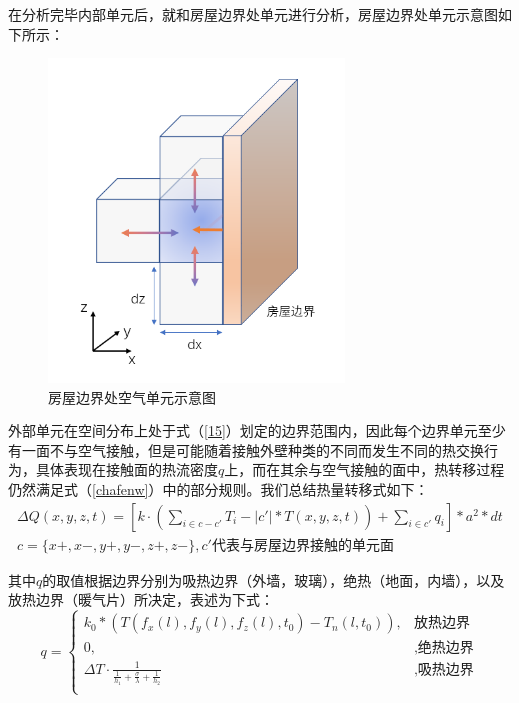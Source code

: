 \documentclass{my_paper}
\begin{document}
\newpage
在分析完毕内部单元后，就和房屋边界处单元进行分析，房屋边界处单元示意图如下所示：
\begin {figure}[h]
\centering %
\includegraphics[width=0.7\textwidth]{wyb.png}
\caption{房屋边界处空气单元示意图} %
\label{five}
\end {figure}

外部单元在空间分布上处于式（\ref{15}）划定的边界范围内，因此每个边界单元至少有一面不与空气接触，但是可能随着接触外壁种类的不同而发生不同的热交换行为，具体表现在接触面的热流密度$q$上，而在其余与空气接触的面中，热转移过程仍然满足式（\ref{chafenw}）中的部分规则。我们总结热量转移式如下：
\begin{equation}
    \begin{aligned}
        \Delta Q(x,y,z,t) = [k \cdot (\sum_{i\in c-c'}T_i-|c'|*T(x,y,z,t))+\sum_{i\in c'}q_i]*a^2*dt\\
        c = \{x+,x-,y+,y-,z+,z-\},c'\text{代表与房屋边界接触的单元面}
    \end{aligned}
\label{}
\end{equation}

其中$q$的取值根据边界分别为吸热边界（外墙，玻璃），绝热（地面，内墙），以及放热边界（暖气片）所决定，表述为下式：
\begin{equation}
    q = \begin{cases}
         k_0 * (T(f_x(l),f_y(l),f_z(l),t_0)-T_n(l,t_0)),& \text{放热边界}\\
         0,& ,\text{绝热边界}\\
        \Delta T \cdot \frac{1}{\frac{1}{h_1}+\frac{\sigma}{\lambda}+\frac{1}{h_2}}&,\text{吸热边界}\\
    \end{cases}
    \label{shi2}
\end{equation}
\end{document}

